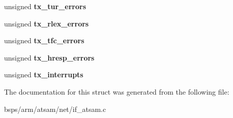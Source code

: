 \begin{DoxyCompactItemize}
unsigned {\bfseries tx\+\_\+tur\+\_\+errors}
\item 
\mbox{\label{structif__atsam__softc_ad2151db15f9a0789bb8b47aa32b1e518}} 
unsigned {\bfseries tx\+\_\+rlex\+\_\+errors}
\item 
\mbox{\label{structif__atsam__softc_ad017953b0bb0f56b411f459e851fc7cd}} 
unsigned {\bfseries tx\+\_\+tfc\+\_\+errors}
\item 
\mbox{\label{structif__atsam__softc_a89e95c688c0cadbc380b87287d33f3e3}} 
unsigned {\bfseries tx\+\_\+hresp\+\_\+errors}
\item 
\mbox{\label{structif__atsam__softc_a6827ed14616a759345be5f6d9aca1363}} 
unsigned {\bfseries tx\+\_\+interrupts}
\end{DoxyCompactItemize}


The documentation for this struct was generated from the following file\+:\begin{DoxyCompactItemize}
\item 
bsps/arm/atsam/net/if\+\_\+atsam.\+c\end{DoxyCompactItemize}
